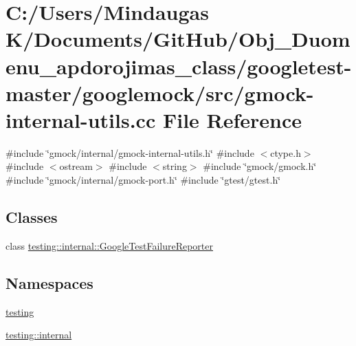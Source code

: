 \hypertarget{googletest-master_2googlemock_2src_2gmock-internal-utils_8cc}{}\section{C\+:/\+Users/\+Mindaugas K/\+Documents/\+Git\+Hub/\+Obj\+\_\+\+Duomenu\+\_\+apdorojimas\+\_\+class/googletest-\/master/googlemock/src/gmock-\/internal-\/utils.cc File Reference}
\label{googletest-master_2googlemock_2src_2gmock-internal-utils_8cc}
{\ttfamily \#include \char`\"{}gmock/internal/gmock-\/internal-\/utils.\+h\char`\"{}}\newline
{\ttfamily \#include $<$ctype.\+h$>$}\newline
{\ttfamily \#include $<$ostream$>$}\newline
{\ttfamily \#include $<$string$>$}\newline
{\ttfamily \#include \char`\"{}gmock/gmock.\+h\char`\"{}}\newline
{\ttfamily \#include \char`\"{}gmock/internal/gmock-\/port.\+h\char`\"{}}\newline
{\ttfamily \#include \char`\"{}gtest/gtest.\+h\char`\"{}}\newline
\subsection*{Classes}
\begin{DoxyCompactItemize}
\item 
class \mbox{\hyperlink{classtesting_1_1internal_1_1_google_test_failure_reporter}{testing\+::internal\+::\+Google\+Test\+Failure\+Reporter}}
\end{DoxyCompactItemize}
\subsection*{Namespaces}
\begin{DoxyCompactItemize}
\item 
 \mbox{\hyperlink{namespacetesting}{testing}}
\item 
 \mbox{\hyperlink{namespacetesting_1_1internal}{testing\+::internal}}
\end{DoxyCompactItemize}
